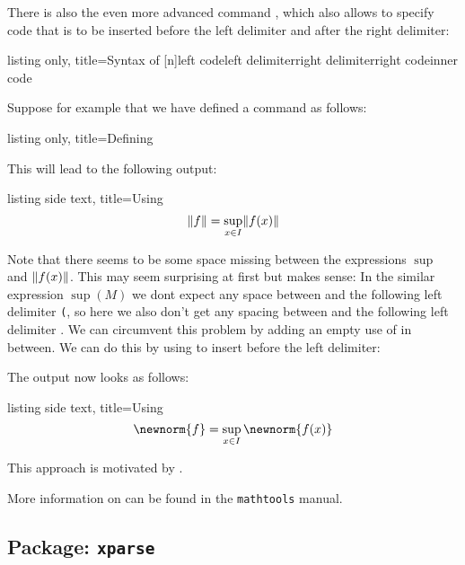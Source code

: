 \documentclass[a4paper, 10pt, headings=standardclasses, oneside, bibliography=totocnumbered]{scrbook}
\begin{document}
There is also the even more advanced command , which also allows to specify code that is to be inserted before the left delimiter and after the right delimiter:
\begin{tcblisting}{listing only, title={Syntax of }}
\DeclarePairedDelimiterXPP{\name}[n]{left code}{left delimiter}{right delimiter}{right code}{inner code}
\end{tcblisting}
Suppose for example that we have defined a command  as follows:
\begin{tcblisting}{listing only, title={Defining }}
\DeclarePairedDelimiter{\norm}{\lVert}{\rVert}
\end{tcblisting}
This will lead to the following output:
\begin{tcblisting}{listing side text, title={Using }}
\[
  \norm{f}
  =
  \sup_{x \in I} \norm{f(x)}
\]
\end{tcblisting}
Note that there seems to be some space missing between the expressions $\sup$ and $\norm{f(x)}$.
This may seem surprising at first but makes sense:
In the similar expression $\sup(M)$ we dont expect any space between  and the following left delimiter \texttt{(}, so here we also don’t get any spacing between  and the following left delimiter .
We can circumvent this problem by adding an empty use of  in between.
We can do this by using  to insert  before the left delimiter:
The output now looks as follows:
\begin{tcblisting}{listing side text, title={Using }}
\[
  \newnorm{f}
  =
  \sup_{x \in I} \newnorm{f(x)}
\]
\end{tcblisting}
This approach is motivated by \cite{tex_advancedpair}.

More information on  can be found in the \texttt{mathtools} manual.



\subsection{Package: \texttt{xparse}}
\end{document}
